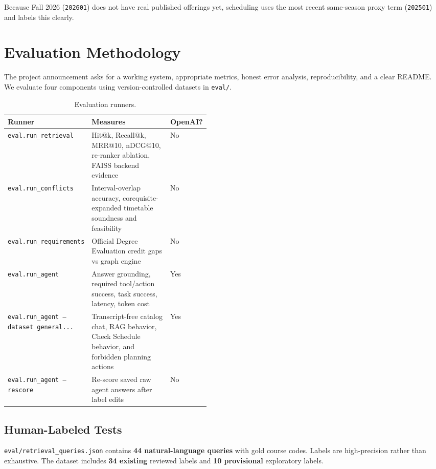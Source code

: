 \documentclass[10pt,letterpaper]{article}
\newcommand{\code}[1]{\texttt{#1}}
\begin{document}
Because Fall 2026 (\code{202601}) does not have real published offerings yet, scheduling uses the most recent same-season proxy term (\code{202501}) and labels this clearly.

\section{Evaluation Methodology}

The project announcement asks for a working system, appropriate metrics, honest error analysis, reproducibility, and a clear README. We evaluate four components using version-controlled datasets in \code{eval/}.

\begin{table}[h]
\centering
\small
\begin{tabularx}{\linewidth}{@{}p{0.29\linewidth}Yp{0.17\linewidth}@{}}
\toprule
\textbf{Runner} & \textbf{Measures} & \textbf{OpenAI?} \\
\midrule
\code{eval.run\_retrieval} & Hit@k, Recall@k, MRR@10, nDCG@10, re-ranker ablation, FAISS backend evidence & No \\
\code{eval.run\_conflicts} & Interval-overlap accuracy, corequisite-expanded timetable soundness and feasibility & No \\
\code{eval.run\_requirements} & Official Degree Evaluation credit gaps vs graph engine & No \\
\code{eval.run\_agent} & Answer grounding, required tool/action success, task success, latency, token cost & Yes \\
\code{eval.run\_agent --dataset general...} & Transcript-free catalog chat, RAG behavior, Check Schedule behavior, and forbidden planning actions & Yes \\
\code{eval.run\_agent --rescore} & Re-score saved raw agent answers after label edits & No \\
\bottomrule
\end{tabularx}
\caption{Evaluation runners.}
\end{table}

\subsection{Human-Labeled Tests}
\code{eval/retrieval\_queries.json} contains \textbf{44 natural-language queries} with gold course codes. Labels are high-precision rather than exhaustive. The dataset includes \textbf{34 existing} reviewed labels and \textbf{10 provisional} exploratory labels.
\end{document}
